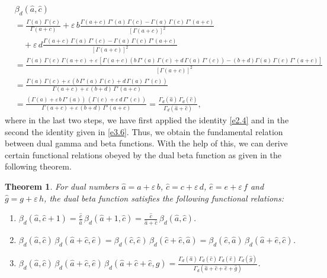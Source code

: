 \documentclass[11pt,a4paper,fleqn]{article}
\newtheorem{theorem}{Theorem}
\numberwithin{equation}{section}
\numberwithin{lemma}{section}
\numberwithin{theorem}{section}
\numberwithin{corollary}{section}
\begin{document}
\begin{align}
	& \beta_d (\widehat{a}, \widehat{c})\nonumber\\
	& = \frac{\Gamma (a) \, \Gamma (c)}{\Gamma (a + c)} + \varepsilon \, b \frac{\Gamma (a + c) \, \Gamma'(a) \, \Gamma (c) - \Gamma (a) \, \Gamma (c) \, \Gamma' (a + c)}{[\Gamma (a + c)]^2}\nonumber\\
	& \quad   + \varepsilon \, d \frac{\Gamma (a + c) \, \Gamma(a) \, \Gamma' (c) - \Gamma (a) \, \Gamma (c) \, \Gamma' (a + c)}{[\Gamma (a + c)]^2}\nonumber\\
	& = \frac{\Gamma (a) \, \Gamma (c) \, \Gamma (a + c) + \varepsilon \, [\Gamma (a + c) (b \, \Gamma'(a) \, \Gamma (c) + d \, \Gamma(a) \, \Gamma' (c)) - (b + d) \Gamma (a) \, \Gamma (c) \, \Gamma' (a + c)]}{[\Gamma (a + c)]^2}\nonumber\\
	& = \frac{\Gamma (a) \, \Gamma (c) + \varepsilon \, (b \, \Gamma'(a) \, \Gamma (c) + d \, \Gamma(a) \, \Gamma' (c))}{\Gamma (a + c) + \varepsilon \, (b + d) \, \Gamma'(a + c)}\nonumber\\
	& = \frac{(\Gamma (a) + \varepsilon \, b \, \Gamma'(a)) \, (\Gamma (c) + \varepsilon \, d \, \Gamma'(c))}{\Gamma (a + c) + \varepsilon \, (b + d) \, \Gamma'(a + c)} = \frac{\Gamma_d (\widehat{a}) \, \Gamma_d (\widehat{c})}{\Gamma_d(\widehat{a} + \widehat{c})},\label{e3.4}
\end{align}
where in the last two steps, we have first applied the identity \eqref{e2.4} and in the second the identity given in \eqref{e3.6}.  Thus, we obtain the fundamental relation between dual gamma and beta functions. With the help of this, we can derive certain functional relations obeyed by the dual beta function as given in the following theorem.
\begin{theorem}
	For dual numbers $\widehat{a} = a + \varepsilon \, b$, $\widehat{c} = c + \varepsilon \, d$, $\widehat{e} = e + \varepsilon \, f$ and $\widehat{g} = g + \varepsilon \, h$, the dual beta function satisfies the following functional relations:
	\begin{enumerate}
		\item $\beta_d (\widehat{a}, \widehat{c} + 1) = \frac{\widehat{c}}{\widehat{a}} \, \beta_d (\widehat{a} + 1, \widehat{c}) = \frac{\widehat{c}}{\widehat{a} + \widehat{c}} \, \beta_d (\widehat{a}, \widehat{c})$.
		
		\item $\beta_d (\widehat{a}, \widehat{c}) \, \beta_d (\widehat{a} + \widehat{c}, \widehat{e}) = \beta_d (\widehat{c}, \widehat{e}) \,  \beta_d (\widehat{c} + \widehat{e}, \widehat{a}) = \beta_d (\widehat{e}, \widehat{a}) \, \beta_d (\widehat{a} + \widehat{e}, \widehat{c})$.
		
		\item $\beta_d (\widehat{a}, \widehat{c}) \, \beta_d (\widehat{a} + \widehat{c}, \widehat{e}) \, \beta_d (\widehat{a} + \widehat{c} + \widehat{e}, \widehat{g}) = \frac{\Gamma_d (\widehat{a}) \, \Gamma_d (\widehat{c}) \, \Gamma_d (\widehat{e}) \, \Gamma_d (\widehat{g})}{\Gamma_d (\widehat{a} + \widehat{c} + \widehat{e} + \widehat{g})}$.
	\end{enumerate}
\end{theorem}
\end{document}
